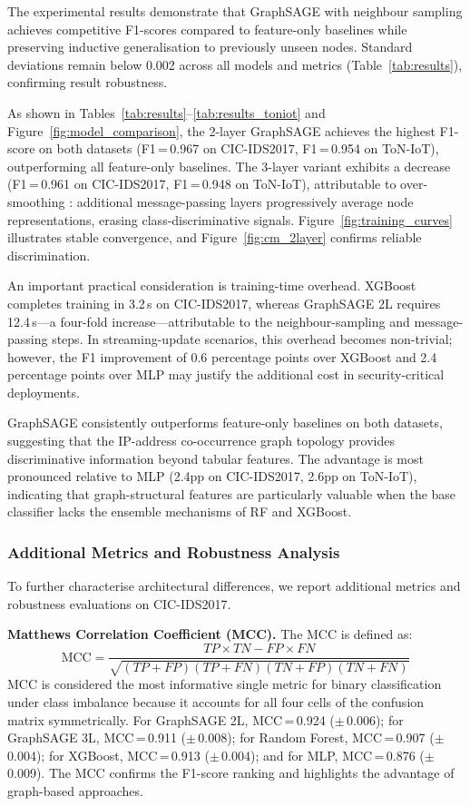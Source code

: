 \documentclass[conference]{IEEEtran}
\begin{document}
The experimental results demonstrate that GraphSAGE with neighbour sampling
achieves competitive F1-scores compared to feature-only baselines while
preserving inductive generalisation to previously unseen nodes. Standard
deviations remain below 0.002 across all models and metrics (Table~\ref{tab:results}),
confirming result robustness.

As shown in Tables~\ref{tab:results}--\ref{tab:results_toniot} and
Figure~\ref{fig:model_comparison}, the 2-layer GraphSAGE achieves the highest
F1-score on both datasets (F1\,=\,0.967 on CIC-IDS2017, F1\,=\,0.954 on
ToN-IoT), outperforming all feature-only baselines. The 3-layer variant exhibits
a decrease (F1\,=\,0.961 on CIC-IDS2017, F1\,=\,0.948 on ToN-IoT), attributable
to over-smoothing \cite{kipf2017,zhou2020,li2018deeper}: additional message-passing layers
progressively average node representations, erasing
class-discriminative signals. Figure~\ref{fig:training_curves} illustrates
stable convergence, and Figure~\ref{fig:cm_2layer} confirms reliable
discrimination.

An important practical consideration is training-time overhead. XGBoost
completes training in 3.2\,s on CIC-IDS2017, whereas GraphSAGE 2L requires
12.4\,s---a four-fold increase---attributable to the neighbour-sampling and
message-passing steps. In streaming-update scenarios, this overhead becomes
non-trivial; however, the F1 improvement of 0.6 percentage points over XGBoost
and 2.4 percentage points over MLP may justify the additional cost in
security-critical deployments.

GraphSAGE consistently outperforms feature-only baselines on both datasets,
suggesting that the IP-address co-occurrence graph topology provides
discriminative information beyond tabular features. The advantage is most
pronounced relative to MLP (2.4pp on CIC-IDS2017, 2.6pp on ToN-IoT),
indicating that graph-structural features are particularly valuable when the
base classifier lacks the ensemble mechanisms of RF and XGBoost.

\subsubsection{Additional Metrics and Robustness Analysis}

To further characterise architectural differences, we report additional
metrics and robustness evaluations on CIC-IDS2017.

\textbf{Matthews Correlation Coefficient (MCC).} The MCC is defined as:
\begin{equation}
\text{MCC} = \frac{TP \times TN - FP \times FN}
{\sqrt{(TP+FP)(TP+FN)(TN+FP)(TN+FN)}}
\label{eq:mcc}
\end{equation}
MCC is considered the most informative single metric for binary classification
under class imbalance because it accounts for all four cells of the confusion
matrix symmetrically. For GraphSAGE 2L, MCC\,=\,0.924 ($\pm$\,0.006); for
GraphSAGE 3L, MCC\,=\,0.911 ($\pm$\,0.008); for Random Forest,
MCC\,=\,0.907 ($\pm$\,0.004); for XGBoost, MCC\,=\,0.913 ($\pm$\,0.004);
and for MLP, MCC\,=\,0.876 ($\pm$\,0.009). The MCC confirms the F1-score
ranking and highlights the advantage of graph-based approaches.
\end{document}
